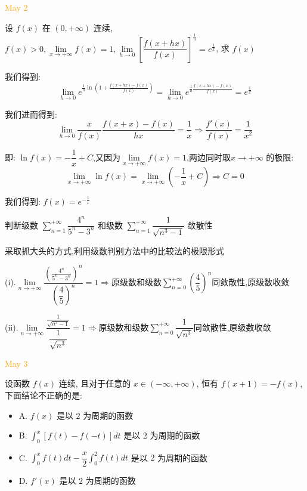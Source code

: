 \textcolor{orange}{May 2}

\begin{example}[][Exam: 31.1.3]
	设 $f(x)$ 在 $(0,+\infty)$ 连续,$f(x)>0,\lim\limits_{x\to +\infty}f(x)=1,\lim\limits_{h\to 0}\left[\dfrac{f(x+hx)}{f(x)} \right]^{\frac{1}{h}}=e^{\frac{1}{x}}$,
	求 $f(x)$
\end{example}

\begin{solution}
	
	我们得到: 
	$$\lim\limits_{h\to 0}e^{\frac{1}{h}\ln(1+\frac{f(x+hx)-f(x)}{f(x)})}=\lim\limits_{h\to 0}e^{\frac{1}{h}\frac{f(x+hx)-f(x)}{f(x)}}=e^{\frac{1}{x}}$$
	
	我们进而得到: 
	$$\lim\limits_{h\to 0}\frac{x}{f(x)}\frac{f(x+x)-f(x)}{hx}=\frac{1}{x}\Rightarrow \frac{f'(x)}{f(x)}=\frac{1}{x^2}$$
	
	即: $\ln f(x)=-\dfrac{1}{x}+C$,又因为$\lim\limits_{x\to  +\infty}f(x)=1$,两边同时取$x\to +\infty$ 的极限: 
	$$\lim\limits_{x\to +\infty}\ln f(x)=\lim\limits_{x\to +\infty}(-\frac{1}{x}+C)\Rightarrow C=0$$
	
	我们得到: $f(x)=e^{-\frac{1}{x}}$
\end{solution}

\begin{example}[][Exam: 31.1.4]
	判断级数 $\sum\limits_{n=1}^{+\infty}\dfrac{4^n}{5^n-3^n}$ 和级数 $\sum\limits_{n=1}^{+\infty}\dfrac{1}{\sqrt{n^3-1}}$ 敛散性
\end{example}

\begin{solution}
	
	采取抓大头的方式,利用级数判别方法中的比较法的极限形式
	
	(i).$\lim\limits_{n\to+\infty}\dfrac{(\frac{4^n}{5^n-3^n})^n}{(\dfrac{4}{5})^n}=1\Rightarrow \text{原级数和级数}\sum\limits_{n=0}^{+\infty}(\dfrac{4}{5})^n\text{同敛散性}$,原级数收敛
	
	(ii).$\lim\limits_{n\to+\infty}\dfrac{\frac{1}{\sqrt{n^3-1}}}{\dfrac{1}{\sqrt{n^3}}}=1\Rightarrow \text{原级数和级数}\sum\limits_{n=0}^{+\infty}\dfrac{1}{\sqrt{n^3}}\text{同敛散性}$,原级数收敛
\end{solution}


\textcolor{orange}{May 3}

\begin{example}[][Exam: 31.1.5]
	设函数 $f(x)$ 连续, 且对于任意的 $x\in(-\infty,+\infty)$, 恒有 $f(x+1)=-f(x)$,下面结论不正确的是: 
\begin{itemize}
	\item A. $f(x)$ 是以 $2$ 为周期的函数 
	\item B. $\int_{0}^{x}[f(t)-f(-t)]dt$ 是以 $2$ 为周期的函数 
	\item C. $\int_{0}^{x}f(t)dt-\dfrac{x}{2}\int_{0}^{2}f(t)dt$ 是以 $2$ 为周期的函数 
	\item D. $f'(x)$ 是以 $2$ 为周期的函数 
\end{itemize}
\end{example}

